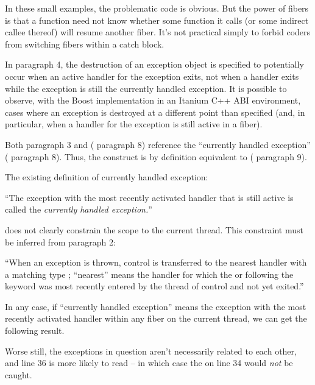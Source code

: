 In these small examples, the problematic code is obvious. But the power of
fibers is that a function need not know whether some function it calls (or
some indirect callee thereof) will resume another fiber. It's not practical
simply to forbid coders from switching fibers within a catch block.


In  paragraph 4, the destruction of an exception
object is specified to potentially occur when an active handler for the
exception exits, not when a handler exits while the exception is still the
currently handled exception. It is possible to observe, with the Boost
implementation in an Itanium C++ ABI environment, cases where an exception is
destroyed at a different point than specified (and, in particular, when a
handler for the exception is still active in a fiber).



Both  paragraph 3 and 
( paragraph 8) reference the ``currently handled
exception'' ( paragraph 8). Thus, the
construct  is by definition equivalent to
( paragraph 9).

The existing definition of currently handled exception:

``The exception with the most recently activated handler that is still active
is called the \emph{currently handled exception.}''

does not clearly constrain the scope to the current thread. This constraint
must be inferred from  paragraph 2:

``When an exception is thrown, control is transferred to the nearest handler
with a matching type ; ``nearest'' means the handler for
which the  or
 following the  keyword was
most recently entered by the thread of control and not yet exited.''

In any case, if ``currently handled exception'' means the exception with the
most recently activated handler within any fiber on the current thread, we can
get the following result.


Worse still, the exceptions in question aren't necessarily related to each
other, and line 36 is more likely to read  --
in which case the  on line 34 would \emph{not} be caught.
